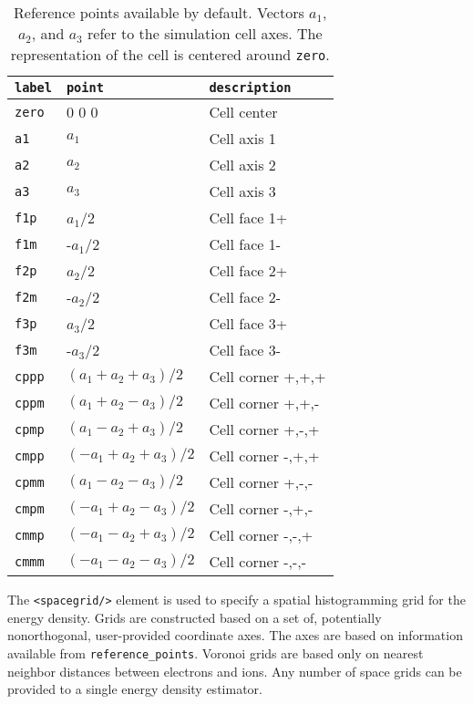 \FloatBarrier
\begin{table}[h]
\begin{center}
\caption{Reference points available by default.  Vectors $a_1$, $a_2$, and $a_3$ refer to the simulation cell axes.  The representation of the cell is centered around \texttt{zero}.}
\begin{tabular}{l l l}
\hline
\texttt{label} & \texttt{point} & \texttt{description} \\
\hline
\texttt{zero} & 0 0 0    & Cell center  \\
\texttt{a1}   &  $a_1$   & Cell axis 1  \\
\texttt{a2}   &  $a_2$   & Cell axis 2  \\
\texttt{a3}   &  $a_3$   & Cell axis 3  \\
\texttt{f1p}  &  $a_1$/2 & Cell face 1+ \\
\texttt{f1m}  & -$a_1$/2 & Cell face 1- \\
\texttt{f2p}  &  $a_2$/2 & Cell face 2+ \\
\texttt{f2m}  & -$a_2$/2 & Cell face 2- \\
\texttt{f3p}  &  $a_3$/2 & Cell face 3+ \\
\texttt{f3m}  & -$a_3$/2 & Cell face 3- \\
\texttt{cppp} & $(a_1+a_2+a_3)/2$  & Cell corner +,+,+ \\
\texttt{cppm} & $(a_1+a_2-a_3)/2$  & Cell corner +,+,- \\
\texttt{cpmp} & $(a_1-a_2+a_3)/2$  & Cell corner +,-,+ \\
\texttt{cmpp} & $(-a_1+a_2+a_3)/2$ & Cell corner -,+,+ \\
\texttt{cpmm} & $(a_1-a_2-a_3)/2$  & Cell corner +,-,- \\
\texttt{cmpm} & $(-a_1+a_2-a_3)/2$ & Cell corner -,+,- \\
\texttt{cmmp} & $(-a_1-a_2+a_3)/2$ & Cell corner -,-,+ \\
\texttt{cmmm} & $(-a_1-a_2-a_3)/2$ & Cell corner -,-,- \\
\hline
\end{tabular}
\end{center}

\protect{\label{tab:ref_points}}
\end{table}
\FloatBarrier



The \texttt{<spacegrid/>} element is used to specify a spatial histogramming grid for the energy density.  Grids are constructed based on a set of, potentially nonorthogonal, user-provided coordinate axes.  The axes are based on information available from \texttt{reference\_points}.  Voronoi grids are based only on nearest neighbor distances between electrons and ions.  Any number of space grids can be provided to a single energy density estimator.


